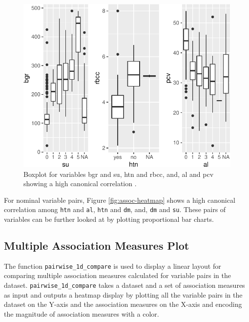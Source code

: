 \begin{Schunk}
\begin{figure}

{\centering \includegraphics{rj_paper_files/figure-latex/mixed-pairs-1} 

}

\caption[Boxplot for variables bgr and su, htn and rbcc, and, al and pcv showing a high canonical correlation ]{Boxplot for variables bgr and su, htn and rbcc, and, al and pcv showing a high canonical correlation . }\label{fig:mixed-pairs}
\end{figure}
\end{Schunk}

For nominal variable pairs, Figure \ref{fig:assoc-heatmap} shows a high
canonical correlation among \texttt{htn} and \texttt{al}, \texttt{htn}
and \texttt{dm}, and, \texttt{dm} and \texttt{su}. These pairs of
variables can be further looked at by plotting proportional bar charts.

\hypertarget{multiple-association-measures-plot}{%
\subsection{Multiple Association Measures
Plot}\label{multiple-association-measures-plot}}

The function \texttt{pairwise\_1d\_compare} is used to display a linear
layout for comparing multiple association measures calculated for
variable pairs in the dataset. \texttt{pairwise\_1d\_compare} takes a
dataset and a set of association measures as input and outputs a heatmap
display by plotting all the variable pairs in the dataset on the Y-axis
and the association measures on the X-axis and encoding the magnitude of
association measures with a color.

